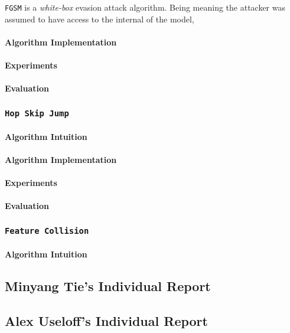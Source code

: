 \documentclass[11pt]{article}
\newcommand{\ilc}{\texttt}
\begin{document}
\ilc{FGSM} is a \textit{white-box} evasion attack algorithm. Being  meaning the attacker was assumed to have access to the internal of the model,

\paragraph{Algorithm Implementation}
\paragraph{Experiments}
\paragraph{Evaluation}

\subsubsection{\ilc{Hop Skip Jump}}
\paragraph{Algorithm Intuition}
\paragraph{Algorithm Implementation}
\paragraph{Experiments}
\paragraph{Evaluation}


\subsubsection{\ilc{Feature Collision}}
\paragraph{Algorithm Intuition}


\subsection{Minyang Tie's Individual Report}


\subsection{Alex Useloff's Individual Report}
\end{document}
